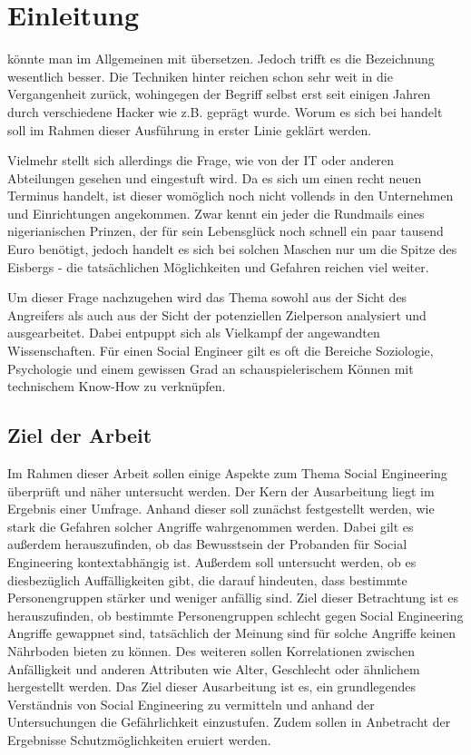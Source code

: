 \section{Einleitung}\label{sec:2_einleitung}
 könnte man im Allgemeinen mit  übersetzen.
Jedoch trifft es die Bezeichnung  wesentlich besser.
Die Techniken hinter  reichen schon sehr weit in die Vergangenheit zurück, wohingegen der Begriff selbst erst seit einigen Jahren durch verschiedene Hacker wie z.B.  geprägt wurde.
Worum es sich bei  handelt soll im Rahmen dieser Ausführung in erster Linie geklärt werden.

Vielmehr stellt sich allerdings die Frage, wie  von der IT oder anderen Abteilungen gesehen und eingestuft wird.
Da es sich um einen recht neuen Terminus handelt, ist dieser womöglich noch nicht vollends in den Unternehmen und Einrichtungen angekommen.
Zwar kennt ein jeder die Rundmails eines nigerianischen Prinzen, der für sein Lebensglück noch schnell ein paar tausend Euro benötigt, jedoch handelt es sich bei solchen Maschen nur um die Spitze des Eisbergs  - die tatsächlichen Möglichkeiten und Gefahren reichen viel weiter.

Um dieser Frage nachzugehen wird das Thema sowohl aus der Sicht des Angreifers als auch aus der Sicht der potenziellen Zielperson analysiert und ausgearbeitet.
Dabei entpuppt sich  als Vielkampf der angewandten Wissenschaften.
Für einen Social Engineer gilt es oft die Bereiche Soziologie, Psychologie und einem gewissen Grad an schauspielerischem Können mit technischem Know-How zu verknüpfen.

\subsection{Ziel der Arbeit}\label{sec:ziel_der_arbeit}
Im Rahmen dieser Arbeit sollen einige Aspekte zum Thema Social Engineering überprüft und näher untersucht werden.
Der Kern der Ausarbeitung liegt im Ergebnis einer Umfrage.
Anhand dieser soll zunächst festgestellt werden, wie stark die Gefahren solcher Angriffe wahrgenommen werden.
Dabei gilt es außerdem herauszufinden, ob das Bewusstsein der Probanden für Social Engineering kontextabhängig ist.
Außerdem soll untersucht werden, ob es diesbezüglich Auffälligkeiten gibt, die darauf hindeuten, dass bestimmte Personengruppen stärker und weniger anfällig sind.
Ziel dieser Betrachtung ist es herauszufinden, ob bestimmte Personengruppen schlecht gegen Social Engineering Angriffe gewappnet sind, tatsächlich der Meinung sind für solche Angriffe keinen Nährboden bieten zu können.
Des weiteren sollen Korrelationen zwischen Anfälligkeit und anderen Attributen wie Alter, Geschlecht oder ähnlichem hergestellt werden.
Das Ziel dieser Ausarbeitung ist es, ein grundlegendes Verständnis von Social Engineering zu vermitteln
und anhand der Untersuchungen die Gefährlichkeit einzustufen. Zudem sollen in Anbetracht der Ergebnisse
Schutzmöglichkeiten eruiert werden.

